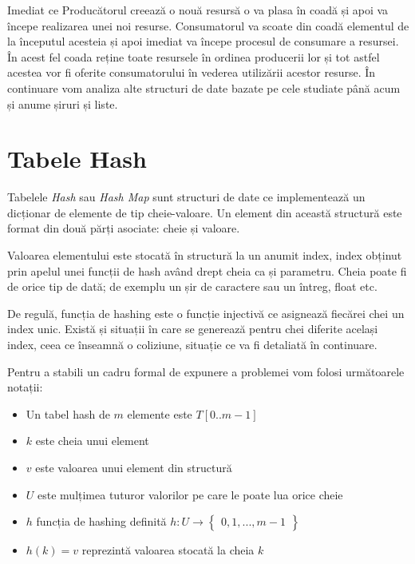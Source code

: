 Imediat ce Producătorul creează o nouă resursă o va plasa în coadă și apoi va începe realizarea unei noi resurse. Consumatorul va scoate din coadă elementul de la începutul acesteia și apoi imediat va începe procesul de consumare a resursei. În acest fel coada reține toate resursele în ordinea producerii lor și tot astfel acestea vor fi oferite consumatorului în vederea utilizării acestor resurse.
În continuare vom analiza alte structuri de date bazate pe cele studiate până acum și anume șiruri și liste. 

\newpage

\section{Tabele Hash}

Tabelele \textit{Hash} sau \textit{Hash Map} sunt structuri de date ce implementează un dicționar de elemente de tip cheie-valoare. Un element din această structură este format din două părți asociate: cheie și valoare.

Valoarea elementului este stocată în structură la un anumit index, index obținut prin apelul unei funcții de hash având drept cheia ca și parametru. Cheia poate fi de orice tip de dată; de exemplu un șir de caractere sau un întreg, float etc.

De regulă, funcția de hashing este o funcție injectivă ce asignează fiecărei chei un index unic. Există și situații în care se generează pentru chei diferite același index, ceea ce înseamnă o coliziune, situație ce va fi detaliată în continuare.

Pentru a stabili un cadru formal de expunere a problemei vom folosi următoarele notații:

\begin{itemize}
\item{Un tabel hash de $m$ elemente este $T[0..m-1]$}
\item{$k$ este cheia unui element}
\item{$v$ este valoarea unui element din structură}
\item{$U$ este mulțimea tuturor valorilor pe care le poate lua orice cheie}
\item{$h$ funcția de hashing definită $h:U \rightarrow   \begin{Bmatrix} 0,1,...,m-1 \end{Bmatrix}$ }
\item{$h(k)=v$ reprezintă valoarea stocată la cheia $k$}
\end{itemize}

